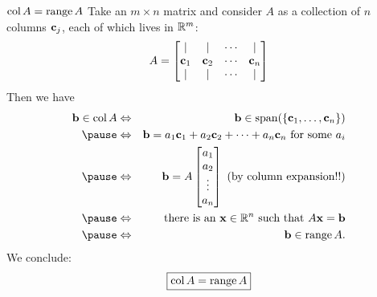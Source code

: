 \begin{frame}{$\operatorname{col} A=\operatorname{range} A$}
Take an $m\times n$ matrix and consider $A$ as a collection of $n$ columns ${\mathbf c}_j$, each of which lives in ${\mathbb R}^m$:
\[
A=\begin{bmatrix}
\vert&\vert& \cdots &\vert\\
{\mathbf c}_1&{\mathbf c}_2&\cdots &{\mathbf c}_n\\
\vert&\vert& \cdots &\vert
\end{bmatrix}
\]
\pause
Then we have 
\begin{eqnarray*}
\boldb\in\CS A &\Leftrightarrow& \boldb\in\Span(\{\boldc_1,\dots,\boldc_n\})\\
\pause&\Leftrightarrow & \boldb=a_1\boldc_1+a_2\boldc_2+\cdots + a_n\boldc_n \text{ for some $a_i$}\\
\pause&\Leftrightarrow & \boldb=A\begin{bmatrix}
a_1\\ a_2\\ \vdots \\ a_n
\end{bmatrix} \text{ (by column expansion!!)} \\
\pause&\Leftrightarrow & \text{ there is an $\boldx\in\R^n$ such that } A\boldx=\boldb \\
\pause&\Leftrightarrow &\boldb\in \range A.
\end{eqnarray*}
We conclude:
\[
\boxed{\operatorname{col} A=\operatorname{range} A}
\]
\end{frame}

